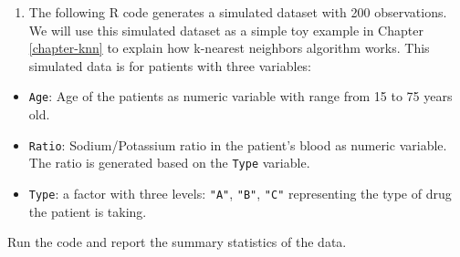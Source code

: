 \documentclass[
  11pt,
]{book}
\providecommand{\tightlist}{%
  \setlength{\itemsep}{0pt}\setlength{\parskip}{0pt}}
\theoremstyle{definition}
\theoremstyle{definition}
\theoremstyle{definition}
\theoremstyle{definition}
\theoremstyle{remark}
\begin{document}
\begin{enumerate}
\def\labelenumi{\arabic{enumi}.}
\setcounter{enumi}{16}
\tightlist
\item
  The following R code generates a simulated dataset with 200 observations. We will use this simulated dataset as a simple toy example in Chapter \ref{chapter-knn} to explain how k-nearest neighbors algorithm works. This simulated data is for patients with three variables:
\end{enumerate}

\begin{itemize}
\tightlist
\item
  \texttt{Age}: Age of the patients as numeric variable with range from 15 to 75 years old.\\
\item
  \texttt{Ratio}: Sodium/Potassium ratio in the patient's blood as numeric variable. The ratio is generated based on the \texttt{Type} variable.
\item
  \texttt{Type}: a factor with three levels: \texttt{"A"}, \texttt{"B"}, \texttt{"C"} representing the type of drug the patient is taking.
\end{itemize}

Run the code and report the summary statistics of the data.
\end{document}
